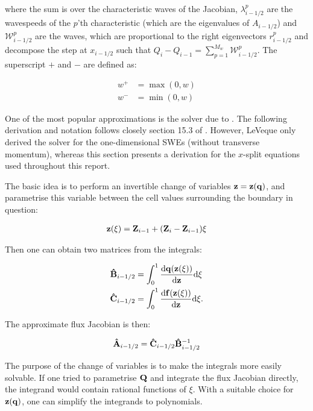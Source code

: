 where the sum is over the characteristic waves of the Jacobian, $\lambda_{i-1/2}^p$ are the wavespeeds of the $p$'th characteristic (which are the eigenvalues of $A_{i-1/2}$) and $\mathcal{W}_{i-1/2}^p$ are the waves, which are proportional to the right eigenvectors $r_{i-1/2}^p$ and decompose the step at $x_{i-1/2}$ such that $Q_i - Q_{i-1} = \sum_{p=1}^{M_w} \mathcal{W}_{i-1/2}^p$. The superscript $+$ and $-$ are defined as:

\begin{align}
  w^+ &= \max(0, w) \\
  w^- &= \min(0, w)
\end{align}

One of the most popular approximations is the solver due to \citet{roe1981approximate}. The following derivation and notation follows closely section 15.3 of \citet{leveque2002finite}. However, LeVeque only derived the solver for the one-dimensional SWEs (without transverse momentum), whereas this section presents a derivation for the $x$-split equations used throughout this report.

The basic idea is to perform an invertible change of variables $\vb z = \vb z(\vb q)$, and parametrise this variable between the cell values surrounding the boundary in question:

\begin{align}
  \vb z(\xi) = \vb Z_{i-1} + (\vb Z_i - \vb Z_{i-1})\xi
\end{align}

Then one can obtain two matrices from the integrals:

\begin{subequations}
  \label{eq:roe_integrals}
  \begin{align}
    \vu B_{i-1/2} &= \int_0^1 \dv{\vb q(\vb z(\xi))}{\vb z} \dd \xi \\
    \vu C_{i-1/2} &= \int_0^1 \dv{\vb f(\vb z(\xi))}{\vb z} \dd \xi.
  \end{align}
\end{subequations}

The approximate flux Jacobian is then:

\begin{align}
  \label{eq:roe_product}
  \vu A_{i-1/2} = \vu C_{i-1/2} \vu B_{i-1/2}^{-1}
\end{align}

The purpose of the change of variables is to make the integrals more easily solvable. If one tried to parametrise $\vb Q$ and integrate the flux Jacobian directly, the integrand would contain rational functions of $\xi$. With a suitable choice for $\vb z(\vb q)$, one can simplify the integrands to polynomials.

